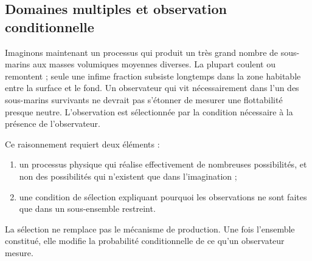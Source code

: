 \begin{classroomqa}
\end{classroomqa}

\subsection{Domaines multiples et observation conditionnelle}

Imaginons maintenant un processus qui produit un très grand nombre de sous-marins aux masses volumiques moyennes diverses. La plupart coulent ou remontent ; seule une infime fraction subsiste longtemps dans la zone habitable entre la surface et le fond. Un observateur qui vit nécessairement dans l’un des sous-marins survivants ne devrait pas s’étonner de mesurer une flottabilité presque neutre. L’observation est sélectionnée par la condition nécessaire à la présence de l’observateur.

Ce raisonnement requiert deux éléments :
\begin{enumerate}
\item un processus physique qui réalise effectivement de nombreuses possibilités, et non des possibilités qui n’existent que dans l’imagination ;
\item une condition de sélection expliquant pourquoi les observations ne sont faites que dans un sous-ensemble restreint.
\end{enumerate}
La sélection ne remplace pas le mécanisme de production. Une fois l’ensemble constitué, elle modifie la probabilité conditionnelle de ce qu’un observateur mesure.

\begin{classroomqa}
\end{classroomqa}


